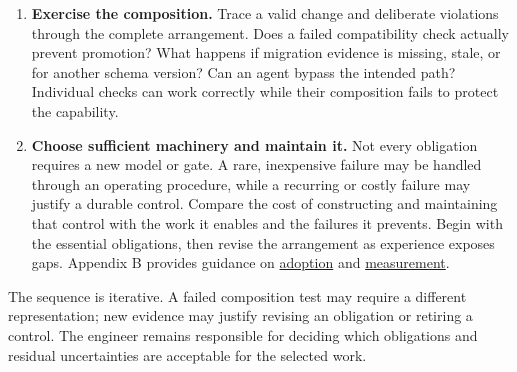 \begin{enumerate}
\item \textbf{Exercise the composition.} Trace a valid change and deliberate violations through the complete arrangement. Does a failed compatibility check actually prevent promotion? What happens if migration evidence is missing, stale, or for another schema version? Can an agent bypass the intended path? Individual checks can work correctly while their composition fails to protect the capability.

\item \textbf{Choose sufficient machinery and maintain it.} Not every obligation requires a new model or gate. A rare, inexpensive failure may be handled through an operating procedure, while a recurring or costly failure may justify a durable control. Compare the cost of constructing and maintaining that control with the work it enables and the failures it prevents. Begin with the essential obligations, then revise the arrangement as experience exposes gaps. Appendix B provides guidance on \href{appendix-b-getting-started.html}{adoption} and \href{appendix-b-measuring-mage.html}{measurement}.
\end{enumerate}

The sequence is iterative. A failed composition test may require a different representation; new evidence may justify revising an obligation or retiring a control. The engineer remains responsible for deciding which obligations and residual uncertainties are acceptable for the selected work.
